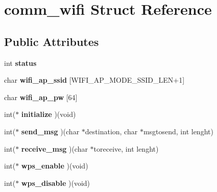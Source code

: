 \hypertarget{structcomm__wifi}{}\section{comm\+\_\+wifi Struct Reference}
\label{structcomm__wifi}
\subsection*{Public Attributes}
\begin{DoxyCompactItemize}
\item 
int {\bfseries status}\hypertarget{structcomm__wifi_adf6d4a45ffe3c3b217901bfea5c82bf5}{}\label{structcomm__wifi_adf6d4a45ffe3c3b217901bfea5c82bf5}

\item 
char {\bfseries wifi\+\_\+ap\+\_\+ssid} \mbox{[}W\+I\+F\+I\+\_\+\+A\+P\+\_\+\+M\+O\+D\+E\+\_\+\+S\+S\+I\+D\+\_\+\+L\+EN+1\mbox{]}\hypertarget{structcomm__wifi_aa3ab0a66eaefe2025131bfca04fe9091}{}\label{structcomm__wifi_aa3ab0a66eaefe2025131bfca04fe9091}

\item 
char {\bfseries wifi\+\_\+ap\+\_\+pw} \mbox{[}64\mbox{]}\hypertarget{structcomm__wifi_af089a13e348b58c8e1f033a1d1ec7c5e}{}\label{structcomm__wifi_af089a13e348b58c8e1f033a1d1ec7c5e}

\item 
int($\ast$ {\bfseries initialize} )(void)\hypertarget{structcomm__wifi_afee41cf8813d85723d65a0aef81fad04}{}\label{structcomm__wifi_afee41cf8813d85723d65a0aef81fad04}

\item 
int($\ast$ {\bfseries send\+\_\+msg} )(char $\ast$destination, char $\ast$msgtosend, int lenght)\hypertarget{structcomm__wifi_a81da34145533c19a95b4b8d7e3c18740}{}\label{structcomm__wifi_a81da34145533c19a95b4b8d7e3c18740}

\item 
int($\ast$ {\bfseries receive\+\_\+msg} )(char $\ast$toreceive, int lenght)\hypertarget{structcomm__wifi_adeec0f9d111b0677fed5cbd2b68c5dce}{}\label{structcomm__wifi_adeec0f9d111b0677fed5cbd2b68c5dce}

\item 
int($\ast$ {\bfseries wps\+\_\+enable} )(void)\hypertarget{structcomm__wifi_ac018505c764585b7b4a96d045f267a6a}{}\label{structcomm__wifi_ac018505c764585b7b4a96d045f267a6a}

\item 
int($\ast$ {\bfseries wps\+\_\+disable} )(void)\hypertarget{structcomm__wifi_a7d445ac61d740464ea95051e64223960}{}\label{structcomm__wifi_a7d445ac61d740464ea95051e64223960}


\end{DoxyCompactItemize}
